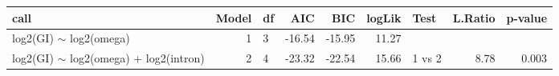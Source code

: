 \begin{table}[ht]
\centering
\begin{tabular}{lrlrrrlrr}
  \hline
call & Model & df & AIC & BIC & logLik & Test & L.Ratio & p-value \\ 
  \hline
log2(GI) $\sim$ log2(omega) &  1 & 3 & -16.54 & -15.95 & 11.27 &  &  &  \\ 
  log2(GI) $\sim$ log2(omega) + log2(intron) &  2 & 4 & -23.32 & -22.54 & 15.66 & 1 vs 2 & 8.78 & 0.003 \\ 
   \hline
\end{tabular}
\end{table}
